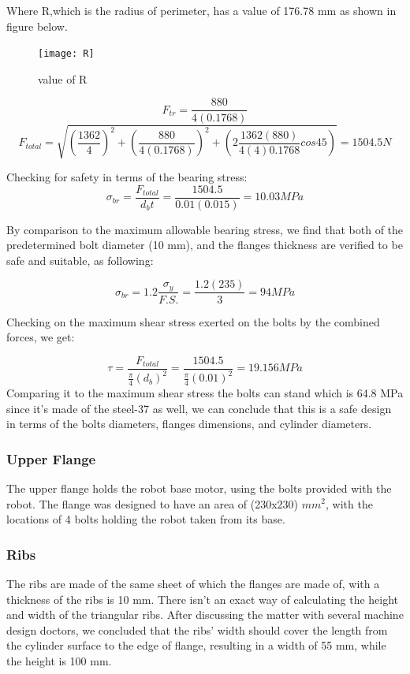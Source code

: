Where R,which  is the radius of perimeter, has a value of 176.78 mm  as shown in figure below.

\begin{figure}[H]
	\begin{center}
		\texttt{[image: R]}
		\caption{value of R}
	\end{center}
\end{figure}

$$ F_{tr} = \frac{880}{4 (0.1768)} $$
$$ F_{total} = \sqrt{(\frac{1362}{4})^{2} + (\frac{880}{4 (0.1768)})^{2} + (2\frac{1362(880)}{4(4)0.1768} cos 45)} = 1504.5 N $$

Checking for safety in terms of the bearing stress:
\begin{equation}
\sigma_{br} = \frac{F_{total}}{d_{b} t} = \frac{1504.5}{0.01(0.015)} = 10.03MPa
\end{equation}

By comparison to the maximum allowable bearing stress, we find that both of the predetermined bolt diameter (10 mm), and the flanges thickness are verified to be safe and suitable, as following:

\begin{equation}
\sigma_{br} = 1.2 \frac{\sigma_{y}}{F.S.} = \frac{1.2(235)}{3} = 94 MPa
\end{equation}

Checking on the maximum shear stress exerted on the bolts by the combined forces, we get:

\begin{equation}
\tau = \frac{F_{total}}{\frac{\pi}{4} (d_{b})^{2}} = \frac{1504.5}{\frac{\pi}{4} (0.01)^{2}} = 19.156 MPa
\end{equation}
Comparing it to the maximum shear stress the bolts can stand which is 64.8 MPa since it's made of the steel-37 as well, we can conclude that this is a safe design in terms of the bolts diameters, flanges dimensions, and cylinder diameters.

\bigskip

\subsubsection{Upper Flange}
The upper flange holds the robot base motor, using the bolts provided with the robot. The flange was designed to have an area of (230x230) $mm^{2}$, with the locations of 4 bolts holding the robot taken from its base.

\bigskip

\subsubsection{Ribs}
The ribs are made of the same sheet of which the flanges are made of, with a thickness of the ribs is 10 mm. 
\newline There isn’t an exact way of calculating the height and width of the triangular ribs. After discussing the matter with several machine design doctors, we concluded that the ribs’ width should cover the length from the cylinder surface to the edge of flange, resulting in a width of 55 mm, while the height is 100 mm.


